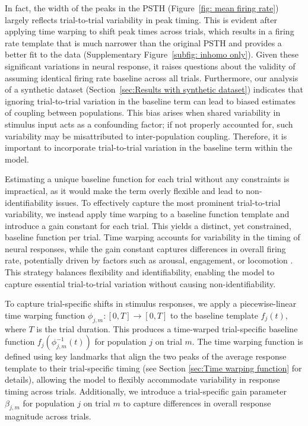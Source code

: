 \documentclass[12pt]{article}
\begin{document}
In fact, the width of the peaks in the PSTH (Figure~\ref{fig: mean firing rate}) largely reflects trial-to-trial variability in peak timing. This is evident after applying time warping to shift peak times across trials, which results in a firing rate template that is much narrower than the original PSTH and provides a better fit to the data (Supplementary Figure~\ref{subfig: inhomo only}). Given these significant variations in neural response, it raises questions about the validity of assuming identical firing rate baseline across all trials. Furthermore, our analysis of a synthetic dataset (Section~\ref{sec:Results with synthetic dataset}) indicates that ignoring trial-to-trial variation in the baseline term can lead to biased estimates of coupling between populations. This bias arises when shared variability in stimulus input acts as a confounding factor; if not properly accounted for, such variability may be misattributed to inter-population coupling. Therefore, it is important to incorporate trial-to-trial variation in the baseline term within the model.

Estimating a unique baseline function for each trial without any constraints is impractical, as it would make the term overly flexible and lead to non-identifiability issues. To effectively capture the most prominent trial-to-trial variability, we instead apply time warping to a baseline function template and introduce a gain constant for each trial. This yields a distinct, yet constrained, baseline function per trial. Time warping accounts for variability in the timing of neural responses, while the gain constant captures differences in overall firing rate, potentially driven by factors such as arousal, engagement, or locomotion \cite{niell2010modulation, vinck2015arousal, yin2023engaged}. This strategy balances flexibility and identifiability, enabling the model to capture essential trial-to-trial variation without causing non-identifiability.

To capture trial-specific shifts in stimulus responses, we apply a piecewise-linear time warping function $\phi_{j,m}: [0, T] \rightarrow [0, T]$ to the baseline template $f_j(t)$, where $T$ is the trial duration. This produces a time-warped trial-specific baseline function $f_j(\phi^{-1}_{j,m}(t))$ for population $j$ on trial $m$. The time warping function is defined using key landmarks that align the two peaks of the average response template to their trial-specific timing (see Section \ref{sec:Time warping function} for details), allowing the model to flexibly accommodate variability in response timing across trials. Additionally, we introduce a trial-specific gain parameter $\beta_{j,m}$ for population $j$ on trial $m$ to capture differences in overall response magnitude across trials.
\end{document}
